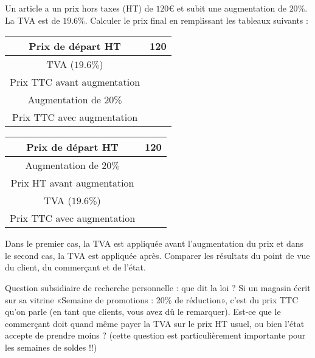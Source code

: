 
\begin{exercice}\label{exosmath-0038}

    Un article a un prix hors taxes (HT) de \( 120\)€ et subit une augmentation de \( 20\%\). La TVA est de \( 19.6\%\). Calculer le prix final en remplissant les tableaux suivants :
    \begin{multicols}{2}
        \begin{tabular}[]{|c||c|}
            \hline
            Prix de départ HT&120\\
            \hline\hline
            TVA (\( 19.6\%\))&\\
            \hline
            Prix TTC avant augmentation&\\
            \hline
            Augmentation de \( 20\%\)&\\
            \hline
            Prix TTC avec augmentation&\\
            \hline
        \end{tabular}

    \columnbreak

        \begin{tabular}[]{|c||c|}
            \hline
            Prix de départ HT&120\\
            \hline\hline
            Augmentation de \( 20\%\)&\\
            \hline
            Prix HT avant augmentation&\\
            \hline
            TVA (\( 19.6\%\))&\\
            \hline
            Prix TTC avec augmentation&\\
            \hline
        \end{tabular}
    \end{multicols}

    Dans le premier cas, la TVA est appliquée avant l'augmentation du prix et dans le second cas, la TVA est appliquée après. Comparer les résultats du point de vue du client, du commerçant et de l'état.

    Question subsidiaire de recherche personnelle : que dit la loi ? Si un magasin écrit sur sa vitrine «Semaine de promotions : 20\% de réduction», c'est du prix TTC qu'on parle (en tant que clients, vous avez dû le remarquer). Est-ce que le commerçant doit quand même payer la TVA sur le prix HT usuel, ou bien l'état accepte de prendre moins ? (cette question est particulièrement importante pour les semaines de soldes !!)

\end{exercice}

